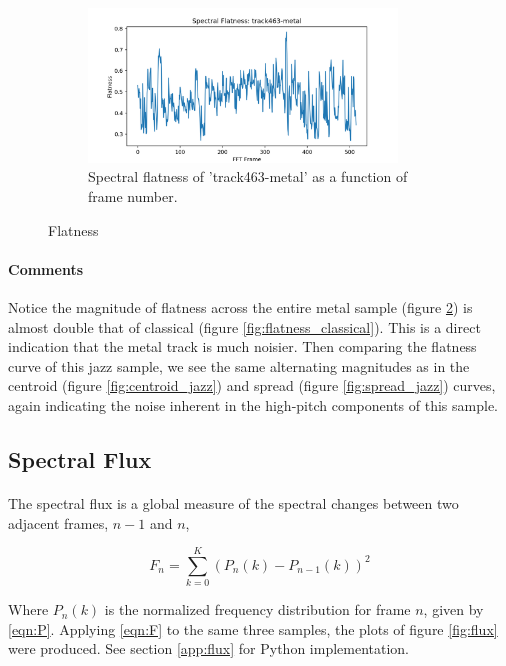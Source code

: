 \documentclass[11pt,a4paper]{article}
\begin{document}
\begin{figure}[tb]\ContinuedFloat
	\begin{subfigure}[t]{\hsize}
		\centering
		\includegraphics[width=0.9\textwidth]{flatness_track463-metal}
		\caption{Spectral flatness of 'track463-metal' as a function of frame number.}
		\label{fig:flatness_metal}
	\end{subfigure}
	\caption{Flatness}
\end{figure}

\paragraph{Comments} Notice the magnitude of flatness across the entire metal sample (figure \ref{fig:flatness_metal}) is almost double that of classical (figure \ref{fig:flatness_classical}). This is a direct indication that the metal track is much noisier. Then comparing the flatness curve of this jazz sample, we see the same alternating magnitudes as in the centroid (figure \ref{fig:centroid_jazz}) and spread (figure \ref{fig:spread_jazz}) curves, again indicating the noise inherent in the high-pitch components of this sample.

\subsection{Spectral Flux}
\paragraph*{} The spectral flux is a global measure of the spectral changes between two adjacent frames, $n-1$ and $n$,

\begin{equation} \label{eqn:F}
F_n = \sum_{k=0}^{K} (P_n(k)-P_{n-1}(k))^2
\end{equation}

Where $P_n(k)$ is the normalized frequency distribution for frame $n$, given by \ref{eqn:P}. Applying \ref{eqn:F} to the same three samples, the plots of figure \ref{fig:flux} were produced. See section \ref{app:flux} for Python implementation.
\end{document}

